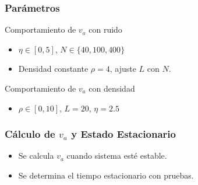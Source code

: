 \begin{frame}
\frametitle{Parámetros}
Comportamiento de \(v_a\) con ruido
    \begin{itemize}
    \item \(\eta \in [0, 5]\), \(N \in \{40, 100, 400\}\)
    \item Densidad constante \(\rho = 4\), ajuste \(L\) con \(N\).
    \end{itemize}
Comportamiento de \(v_a\) con densidad
    \begin{itemize}
    \item \(\rho \in [0, 10]\), \(L = 20\), \(\eta = 2.5\)
\end{itemize}

\end{frame}


\begin{frame}
\frametitle{Cálculo de \(v_a\) y Estado Estacionario}
\begin{itemize}
    \item Se calcula \(v_a\) cuando sistema esté estable.
    \item Se determina el tiempo estacionario con pruebas.
\end{itemize}
\end{frame}

